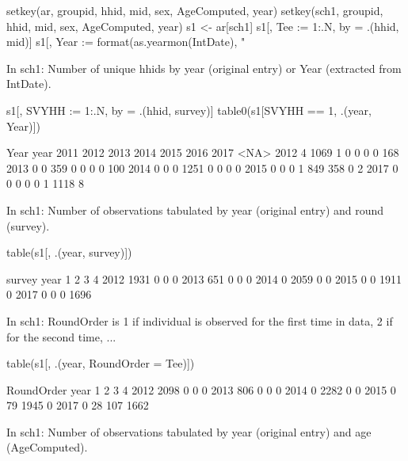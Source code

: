 \begin{Schunk}
\begin{Sinput}
setkey(ar, groupid, hhid, mid, sex, AgeComputed, year)
setkey(sch1, groupid, hhid, mid, sex, AgeComputed, year)
s1 <- ar[sch1]
s1[, Tee := 1:.N, by = .(hhid, mid)]
s1[, Year := format(as.yearmon(IntDate), "%Y")]
\end{Sinput}
\end{Schunk}
In \textsf{sch1}: Number of unique \textsf{hhid}s by \textsf{year} (original entry) or \textsf{Year} (extracted from \textsf{IntDate}).
\begin{Schunk}
\begin{Sinput}
s1[, SVYHH := 1:.N, by = .(hhid, survey)]
table0(s1[SVYHH == 1, .(year, Year)])
\end{Sinput}
\begin{Soutput}
      Year
year   2011 2012 2013 2014 2015 2016 2017 <NA>
  2012    4 1069    1    0    0    0    0  168
  2013    0    0  359    0    0    0    0  100
  2014    0    0    0 1251    0    0    0    0
  2015    0    0    0    1  849  358    0    2
  2017    0    0    0    0    0    1 1118    8
\end{Soutput}
\end{Schunk}
In \textsf{sch1}: Number of observations tabulated by \textsf{year} (original entry) and round (\textsf{survey}).
\begin{Schunk}
\begin{Sinput}
table(s1[, .(year, survey)])
\end{Sinput}
\begin{Soutput}
      survey
year      1    2    3    4
  2012 1931    0    0    0
  2013  651    0    0    0
  2014    0 2059    0    0
  2015    0    0 1911    0
  2017    0    0    0 1696
\end{Soutput}
\end{Schunk}
In \textsf{sch1}: RoundOrder is 1 if individual is observed for the first time in data, 2 if for the second time, ...
\begin{Schunk}
\begin{Sinput}
table(s1[, .(year, RoundOrder = Tee)])
\end{Sinput}
\begin{Soutput}
      RoundOrder
year      1    2    3    4
  2012 2098    0    0    0
  2013  806    0    0    0
  2014    0 2282    0    0
  2015    0   79 1945    0
  2017    0   28  107 1662
\end{Soutput}
\end{Schunk}
In \textsf{sch1}: Number of observations tabulated by \textsf{year} (original entry) and age (\textsf{AgeComputed}).

